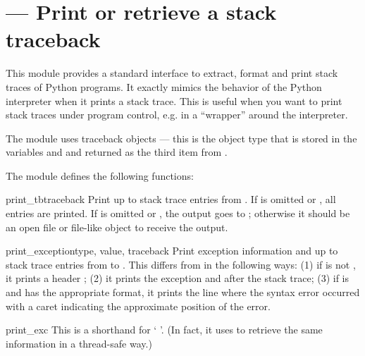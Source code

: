 \section{ ---
         Print or retrieve a stack traceback}



This module provides a standard interface to extract, format and print
stack traces of Python programs.  It exactly mimics the behavior of
the Python interpreter when it prints a stack trace.  This is useful
when you want to print stack traces under program control, e.g. in a
``wrapper'' around the interpreter.

The module uses traceback objects --- this is the object type
that is stored in the variables  and
 and returned as the third item from
.

The module defines the following functions:

\begin{funcdesc}{print_tb}{traceback}
Print up to  stack trace entries from .  If
 is omitted or , all entries are printed.
If  is omitted or , the output goes to
; otherwise it should be an open file or file-like
object to receive the output.
\end{funcdesc}

\begin{funcdesc}{print_exception}{type, value, traceback}
Print exception information and up to  stack trace entries
from  to .
This differs from  in the
following ways: (1) if  is not , it prints a
header ; (2) it prints the
exception  and  after the stack trace; (3) if
 is  and  has the appropriate
format, it prints the line where the syntax error occurred with a
caret indicating the approximate position of the error.
\end{funcdesc}

\begin{funcdesc}{print_exc}{}
This is a shorthand for `
  \code{,}
\code{)}'.  (In fact, it uses  to
retrieve the same information in a thread-safe way.)
\end{funcdesc}

